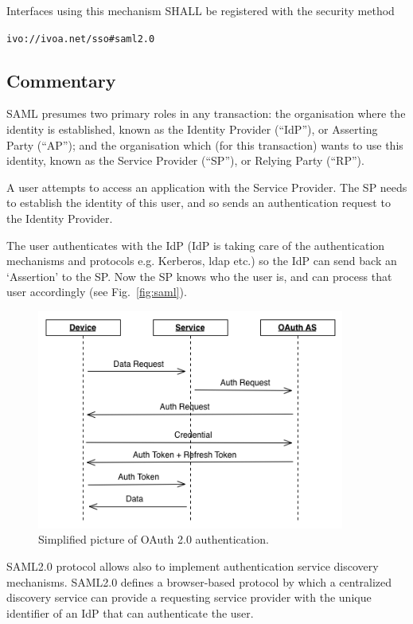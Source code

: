 \documentclass[11pt,a4paper]{ivoa}
\begin{document}
Interfaces using this mechanism SHALL  be registered with the security method 

\texttt{ivo://ivoa.net/sso\#saml2.0}


\subsection{Commentary}
SAML presumes two primary roles in any transaction: the organisation where the identity is established, 
known as the Identity Provider (``IdP''), or Asserting Party (``AP''); 
and the organisation which (for this transaction) wants to use this identity, known as the Service Provider (``SP''), 
or Relying Party (``RP'').

A user attempts to access an application with the Service Provider. 
The SP needs to establish the identity of this user, and so sends an authentication request to the Identity Provider. 

The user authenticates with the IdP (IdP is taking care of the authentication mechanisms and protocols e.g. Kerberos, ldap etc.) so the IdP can send back an `Assertion' to the SP. 
Now the SP knows who the user is, and can process that user accordingly (see Fig.~\ref{fig:saml}).
\begin{figure}
\centering
\includegraphics[width=0.9\textwidth]{SSO_image003.png}
\caption{Simplified picture of OAuth 2.0 authentication.} 
\label{fig:oauth}
\end{figure}
 
SAML2.0 protocol allows also to implement authentication service discovery mechanisms. SAML2.0  defines a browser-based protocol 
by which a centralized discovery service can provide a requesting service provider with the unique identifier of an 
IdP that can authenticate the user.  
\end{document}
